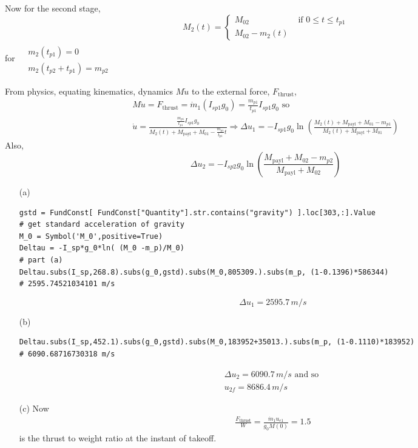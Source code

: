 \documentclass[10pt]{amsart}
\begin{document}
\begin{multicols*}{2}
Now for the second stage,
\[
M_2(t) = \begin{cases} M_{02} & \text{ if } 0 \leq t \leq t_{p1} \\ 
  M_{02} - m_2(t) \end{cases} 
\]
for $\begin{aligned} & \quad \\
  & m_2(t_{p1} ) = 0 \\
  & m_2(t_{p2} + t_{p1}) = m_{p2}\end{aligned}$

From physics, equating kinematics, dynamics $M\dot{u}$ to the external force, $F_{\text{thrust}}$,
\[
\begin{gathered}
  M\dot{u} = F_{\text{thrust}} = \dot{m}_1 (I_{sp1} g_0) = \frac{m_{p1}}{t_{p1} } I_{sp1} g_0 \text{ so } \\
  \dot{u} = \frac{ \frac{m_{p1}}{t_{p1}} I_{sp1} g_0 }{ M_2(t) + M_{\text{payl} } + M_{01} - \frac{m_{p1}}{t_{p1}} t } \Longrightarrow \Delta u_1 = -I_{sp1} g_0 \ln{ \left( \frac{M_2(t) + M_{\text{payl}} + M_{01} - m_{p1} }{ M_2(t) + M_{\text{payl}} + M_{01} } \right) }
\end{gathered}
\]
Also,
\[
\Delta u_2 = -I_{sp2} g_0 \ln{ \left( \frac{M_{\text{payl}} + M_{02} - m_{p2} }{ M_{\text{payl}} + M_{02}} \right) }
\]


\begin{enumerate}
\item[(a)]\begin{lstlisting}
gstd = FundConst[ FundConst["Quantity"].str.contains("gravity") ].loc[303,:].Value 
# get standard acceleration of gravity
M_0 = Symbol('M_0',positive=True)
Deltau = -I_sp*g_0*ln( (M_0 -m_p)/M_0) 
# part (a)
Deltau.subs(I_sp,268.8).subs(g_0,gstd).subs(M_0,805309.).subs(m_p, (1-0.1396)*586344) 
# 2595.74521034101 m/s
\end{lstlisting}
\[
\boxed{ \Delta u_1 = 2595.7 \, m/s }
\]
\item[(b)]
\begin{lstlisting}
Deltau.subs(I_sp,452.1).subs(g_0,gstd).subs(M_0,183952+35013.).subs(m_p, (1-0.1110)*183952) 
# 6090.68716730318 m/s
\end{lstlisting}
\[
\begin{gathered}
  \Delta u_2 = 6090.7 \, m/s \text{ and so } \\
  u_{2f} = 8686.4 \, m/s
\end{gathered}
\]
\item[(c)] Now 
\[
\begin{gathered}
  \frac{ F_{\text{thrust}}}{W} = \frac{ \dot{m}_1 u_{e1} }{ g_0 M(0)} = 1.5
\end{gathered}
\]
is the thrust to weight ratio at the instant of takeoff.  


\end{enumerate}
\end{multicols*}
\end{document}
